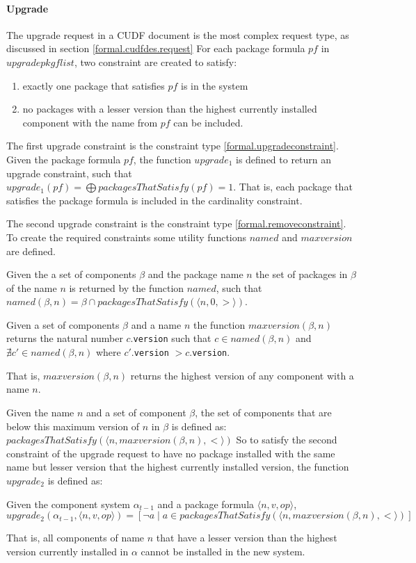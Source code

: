 \paragraph{Upgrade}
The upgrade request in a CUDF document is the most complex request type, as discussed in section \ref{formal.cudfdes.request}
For each package formula $pf$ in $upgradepkgflist$, two constraint are created to satisfy:
\begin{enumerate}
  \item exactly one package that satisfies $pf$ is in the system
  \item no packages with a lesser version than the highest currently installed component with the name from $pf$ can be included.
\end{enumerate} 

The first upgrade constraint is the constraint type \ref{formal.upgradeconstraint}.
Given the package formula $pf$, the function $upgrade_1$ is defined to return an upgrade constraint,
such that $upgrade_1(pf) = \bigoplus packagesThatSatisfy(pf) = 1$.
That is, each package that satisfies the package formula is included in the cardinality constraint.

The second upgrade constraint is the constraint type \ref{formal.removeconstraint}.
To create the required constraints some utility functions $named$ and $maxversion$ are defined.

\begin{defs}
Given the a set of components $\beta$ and the package name $n$ the set of packages in $\beta$ of the name $n$ is returned by the function $named$, such that
$named(\beta,n) = \beta \cap packagesThatSatisfy(\langle n,0,> \rangle)$.
\end{defs} 

\begin{defs}
Given a set of components $\beta$ and a name $n$ the function $maxversion(\beta,n)$ returns the natural number $c$.\verb+version+ 
such that $c \in named(\beta,n)$ and $\nexists c' \in named(\beta,n)$ where $c'$.\verb+version+ $> c$.\verb+version+.
\end{defs}
That is, $maxversion(\beta,n)$ returns the highest version of any component with a name $n$.

Given the name $n$ and a set of component $\beta$, the set of components that are below this maximum version of $n$ in $\beta$ is defined as:
$packagesThatSatisfy(\langle n, maxversion(\beta,n), < \rangle)$
So to satisfy the second constraint of the upgrade request to have no package installed with the same name but lesser version that the highest currently installed version,
the function  $upgrade_2$ is defined as:
\begin{defs}
Given the component system $\alpha_{t-1}$ and a package formula $\langle n,v,op \rangle$,
$upgrade_2(\alpha_{t-1},\langle n,v,op \rangle) = [\neg a \mid a \in packagesThatSatisfy(\langle n, maxversion(\beta,n), < \rangle)]$
\end{defs}
That is, all components of name $n$ that have a lesser version than the highest version currently installed in $\alpha$ cannot be installed in the new system. 

